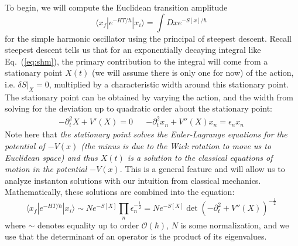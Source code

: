 \documentclass[11pt, oneside]{article}   	%
\theoremstyle{definition}
\begin{document}
To begin, we will compute the Euclidean transition amplitude
\begin{equation}
	\langle x_f | e^{-HT / \hbar} | x_i\rangle = \int Dx e^{-S[x] / \hbar}~
	\label{eq:shm}
\end{equation}
for the simple harmonic oscillator using the principal of steepest descent. Recall steepest descent tells us that for an exponentially decaying 
integral like Eq.~(\ref{eq:shm}), the primary contribution to the integral will come from a stationary point $X(t)$ (we will assume there is only 
one for now) of the action, i.e. $\delta S|_{X} = 0$, multiplied by a characteristic width around this stationary point. The stationary point 
can be obtained by varying the action, and the width from solving for the deviation up to quadratic order about the 
stationary point:
\begin{align}
	- \partial_t^2 X + V'(X) = 0 && - \partial_t^2x_n + V''(X) x_n = \epsilon_n x_n~
	\label{eq:eigenvalue_shm}
\end{align}
Note here that \textit{the stationary point solves the Euler-Lagrange equations for the potential of $-V(x)$ (the minus is due to the Wick rotation 
to move us to Euclidean space) and thus $X(t)$ is a solution to the classical equations of motion in the potential $-V(x)$}. This is a general 
feature and will allow us to analyze instanton solutions with our intuition from classical mechanics. Mathematically, these solutions are 
combined into the equation:
\begin{equation}
	\langle x_f | e^{-HT / \hbar} | x_i\rangle \sim N e^{-S[X]} \prod_n \epsilon_n^{-\frac{1}{2}} = Ne^{-S[X]} \det\left(-\partial_t^2 + 
	V''(X)\right)^{-\frac{1}{2}}~
	\label{eq:instanton_qm}
\end{equation}
where $\sim$ denotes equality up to order $\mathcal O(\hbar)$, $N$ is some normalization, and we use that the determinant of an operator 
is the product of its eigenvalues. 
\end{document}
